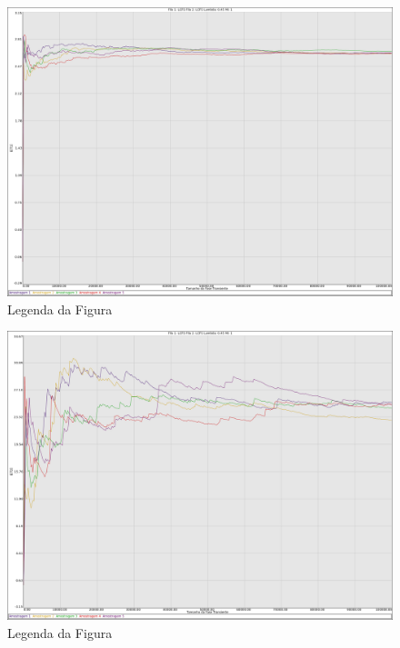 \documentclass[a4paper,10pt]{article}
\begin{document}
\begin{figure}
	\caption{Legenda da Figura}
	\label{figTransienteLCFSfila1T}
	\includegraphics[scale = 0.2]{./graficos_transiente_1/LCFS/05.png}
\end{figure}

\begin{figure}
	\caption{Legenda da Figura}
	\label{figTransienteLCFSfila2T}
	\includegraphics[scale = 0.2]{./graficos_transiente_1/LCFS/06.png}
\end{figure}
\end{document}

